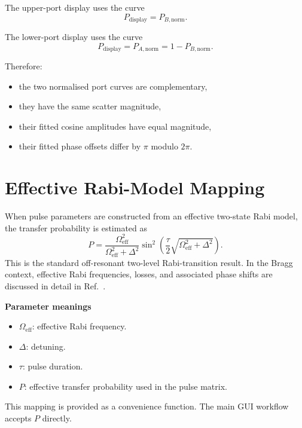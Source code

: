 \documentclass[11pt,a4paper]{article}
\begin{document}
The upper-port display uses the curve
\begin{equation}
  P_{\mathrm{display}} = P_{B,\mathrm{norm}}.
\end{equation}

The lower-port display uses the curve
\begin{equation}
  P_{\mathrm{display}} = P_{A,\mathrm{norm}} = 1 - P_{B,\mathrm{norm}}.
\end{equation}

Therefore:
\begin{itemize}[leftmargin=1.5em]
  \item the two normalised port curves are complementary,
  \item they have the same scatter magnitude,
  \item their fitted cosine amplitudes have equal magnitude,
  \item their fitted phase offsets differ by $\pi$ modulo $2\pi$.
\end{itemize}

\section{Effective Rabi-Model Mapping}

When pulse parameters are constructed from an effective two-state Rabi model, the transfer probability is estimated as
\begin{equation}
  P =
  \frac{\Omega_{\mathrm{eff}}^2}
  {\Omega_{\mathrm{eff}}^2 + \Delta^2}
  \sin^2\left(
    \frac{\tau}{2}
    \sqrt{\Omega_{\mathrm{eff}}^2 + \Delta^2}
  \right).
\end{equation}
This is the standard off-resonant two-level Rabi-transition result. In the Bragg context, effective Rabi frequencies, losses, and associated phase shifts are discussed in detail in Ref.~\cite{Muller2008}.

\textbf{Parameter meanings}
\begin{itemize}[leftmargin=1.5em]
  \item $\Omega_{\mathrm{eff}}$: effective Rabi frequency.
  \item $\Delta$: detuning.
  \item $\tau$: pulse duration.
  \item $P$: effective transfer probability used in the pulse matrix.
\end{itemize}

This mapping is provided as a convenience function. The main GUI workflow accepts $P$ directly.
\end{document}
